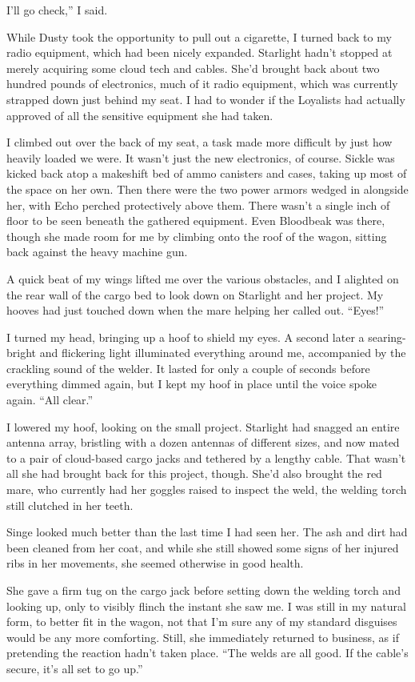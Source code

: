 \leavevmode{}I’ll go check,” I said.

While Dusty took the opportunity to pull out a cigarette, I turned back to my radio equipment, which had been nicely expanded. Starlight hadn’t stopped at merely acquiring some cloud tech and cables. She’d brought back about two hundred pounds of electronics, much of it radio equipment, which was currently strapped down just behind my seat. I had to wonder if the Loyalists had actually approved of all the sensitive equipment she had taken.

I climbed out over the back of my seat, a task made more difficult by just how heavily loaded we were. It wasn’t just the new electronics, of course. Sickle was kicked back atop a makeshift bed of ammo canisters and cases, taking up most of the space on her own. Then there were the two power armors wedged in alongside her, with Echo perched protectively above them. There wasn’t a single inch of floor to be seen beneath the gathered equipment. Even Bloodbeak was there, though she made room for me by climbing onto the roof of the wagon, sitting back against the heavy machine gun.

A quick beat of my wings lifted me over the various obstacles, and I alighted on the rear wall of the cargo bed to look down on Starlight and her project. My hooves had just touched down when the mare helping her called out. “Eyes!”

I turned my head, bringing up a hoof to shield my eyes. A second later a searing-bright and flickering light illuminated everything around me, accompanied by the crackling sound of the welder. It lasted for only a couple of seconds before everything dimmed again, but I kept my hoof in place until the voice spoke again. “All clear.”

I lowered my hoof, looking on the small project. Starlight had snagged an entire antenna array, bristling with a dozen antennas of different sizes, and now mated to a pair of cloud-based cargo jacks and tethered by a lengthy cable. That wasn’t all she had brought back for this project, though. She’d also brought the red mare, who currently had her goggles raised to inspect the weld, the welding torch still clutched in her teeth.

Singe looked much better than the last time I had seen her. The ash and dirt had been cleaned from her coat, and while she still showed some signs of her injured ribs in her movements, she seemed otherwise in good health.

She gave a firm tug on the cargo jack before setting down the welding torch and looking up, only to visibly flinch the instant she saw me. I was still in my natural form, to better fit in the wagon, not that I’m sure any of my standard disguises would be any more comforting. Still, she immediately returned to business, as if pretending the reaction hadn’t taken place. “The welds are all good. If the cable’s secure, it’s all set to go up.”

